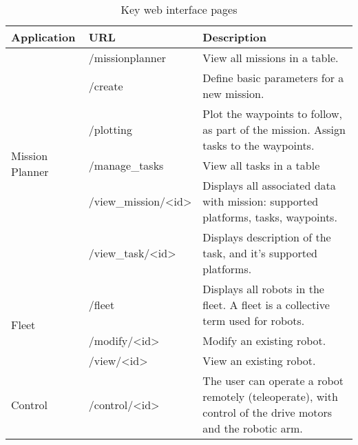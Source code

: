 \begin{table}[!htb]
\centering
\begin{tabular}{|l|l|p{7cm}|}
\hline
\textbf{Application} & \textbf{URL} & \textbf{Description} \\ \hline
\multirow{6}{*}{Mission Planner} & /missionplanner                        & View all missions in a table.                                                                              \\ \cline{2-3} 
                                 & /create                                & Define basic parameters for a new mission.                                                                 \\ \cline{2-3} 
                                 & /plotting                              & Plot the waypoints to follow, as part of the mission. Assign tasks to the waypoints.                       \\ \cline{2-3} 
                                 & /manage\_tasks                         & View all tasks in a table                                                                                  \\ \cline{2-3} 
                                 & /view\_mission/\textless id\textgreater & Displays all associated data with mission: supported platforms, tasks, waypoints.                          \\ \cline{2-3} 
                                 & /view\_task/\textless id\textgreater    & Displays description of the task, and it's supported platforms.                                            \\ \hline
\multirow{3}{*}{Fleet}           & /fleet                                 & Displays all robots in the fleet. A fleet is a collective term used for robots.                            \\ \cline{2-3} 
                                 & /modify/\textless id\textgreater        & Modify an existing robot.                                                                                  \\ \cline{2-3} 
                                 & /view/\textless id\textgreater          & View an existing robot.                                                                                    \\ \hline
Control                          & /control/\textless id\textgreater       & The user can operate a robot remotely (teleoperate), with control of the drive motors and the robotic arm. \\ \hline
\end{tabular}
\caption{Key web interface pages}
\label{tab:web_pages}
\end{table}


